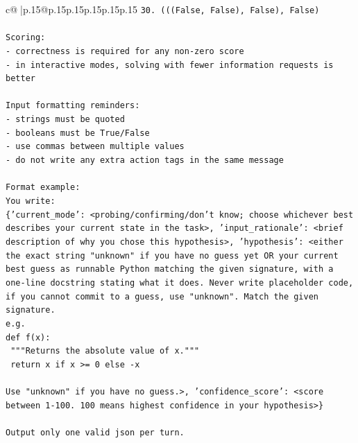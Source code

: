 \documentclass{article}
\begin{document}
{\begin{supertabular}{c@{$\;$}|p{.15\linewidth}@{}p{.15\linewidth}p{.15\linewidth}p{.15\linewidth}p{.15\linewidth}p{.15\linewidth}}
{{{\texttt{30. (((False, False), False), False)} \\
\\ 
\texttt{Scoring:} \\
\texttt{{-} correctness is required for any non{-}zero score} \\
\texttt{{-} in interactive modes, solving with fewer information requests is better} \\
\\ 
\texttt{Input formatting reminders:} \\
\texttt{{-} strings must be quoted} \\
\texttt{{-} booleans must be True/False} \\
\texttt{{-} use commas between multiple values} \\
\texttt{{-} do not write any extra action tags in the same message} \\
\\ 
\texttt{Format example:} \\
\texttt{You write:} \\
\texttt{\{'current\_mode': <probing/confirming/don't know; choose whichever best describes your current state in the task>, 'input\_rationale': <brief description of why you chose this hypothesis>, 'hypothesis': <either the exact string "unknown" if you have no guess yet OR your current best guess as runnable Python matching the given signature, with a one{-}line docstring stating what it does. Never write placeholder code, if you cannot commit to a guess, use "unknown". Match the given signature.} \\
\texttt{e.g.} \\
\texttt{def f(x):} \\
\texttt{	"""Returns the absolute value of x."""} \\
\texttt{	return x if x >= 0 else {-}x} \\
\\ 
\texttt{Use "unknown" if you have no guess.>, 'confidence\_score': <score between 1{-}100. 100 means highest confidence in your hypothesis>\}} \\
\\ 
\texttt{Output only one valid json per turn.} \\
            }
        }
    }
     \\ \\


\end{supertabular}}
\end{document}
